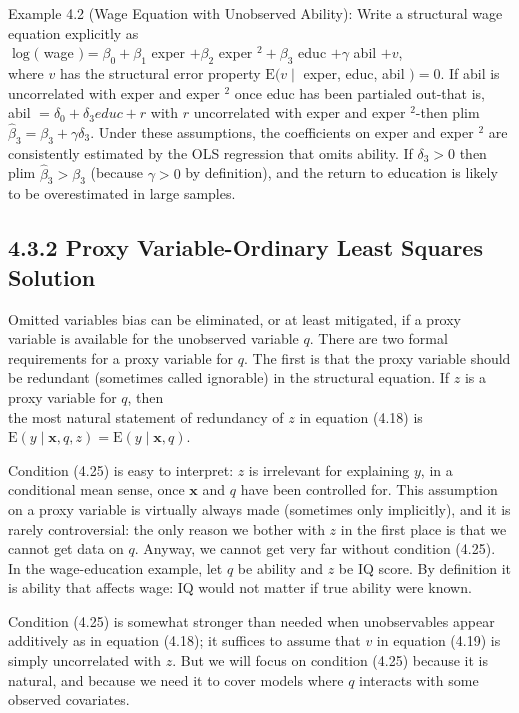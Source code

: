 \documentclass[10pt]{article}
\begin{document}
Example 4.2 (Wage Equation with Unobserved Ability): Write a structural wage equation explicitly as\\
$\log ($ wage $)=\beta_{0}+\beta_{1}$ exper $+\beta_{2}$ exper $^{2}+\beta_{3}$ educ $+\gamma$ abil $+v$,\\
where $v$ has the structural error property $\mathrm{E}(v \mid$ exper, educ, abil $)=0$. If abil is uncorrelated with exper and exper ${ }^{2}$ once educ has been partialed out-that is, abil $=\delta_{0}+ \delta_{3} e d u c+r$ with $r$ uncorrelated with exper and exper ${ }^{2}$-then plim $\hat{\beta}_{3}=\beta_{3}+\gamma \delta_{3}$. Under these assumptions, the coefficients on exper and exper ${ }^{2}$ are consistently estimated by the OLS regression that omits ability. If $\delta_{3}>0$ then plim $\hat{\beta}_{3}>\beta_{3}$ (because $\gamma>0$ by definition), and the return to education is likely to be overestimated in large samples.

\subsection*{4.3.2 Proxy Variable-Ordinary Least Squares Solution}
Omitted variables bias can be eliminated, or at least mitigated, if a proxy variable is available for the unobserved variable $q$. There are two formal requirements for a proxy variable for $q$. The first is that the proxy variable should be redundant (sometimes called ignorable) in the structural equation. If $z$ is a proxy variable for $q$, then\\
the most natural statement of redundancy of $z$ in equation (4.18) is\\
$\mathrm{E}(y \mid \mathbf{x}, q, z)=\mathrm{E}(y \mid \mathbf{x}, q)$.

Condition (4.25) is easy to interpret: $z$ is irrelevant for explaining $y$, in a conditional mean sense, once $\mathbf{x}$ and $q$ have been controlled for. This assumption on a proxy variable is virtually always made (sometimes only implicitly), and it is rarely controversial: the only reason we bother with $z$ in the first place is that we cannot get data on $q$. Anyway, we cannot get very far without condition (4.25). In the wage-education example, let $q$ be ability and $z$ be IQ score. By definition it is ability that affects wage: IQ would not matter if true ability were known.

Condition (4.25) is somewhat stronger than needed when unobservables appear additively as in equation (4.18); it suffices to assume that $v$ in equation (4.19) is simply uncorrelated with $z$. But we will focus on condition (4.25) because it is natural, and because we need it to cover models where $q$ interacts with some observed covariates.
\end{document}
